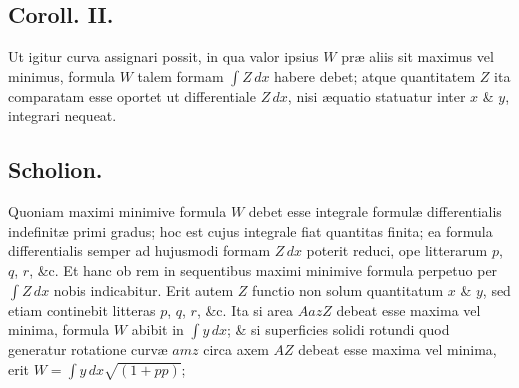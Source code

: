 \subsection*{Coroll. II.}
Ut igitur curva assignari possit, in qua valor ipsius $W$ præ aliis sit maximus vel minimus, formula $W$ talem formam $\int Z\,dx$ habere debet; atque quantitatem $Z$ ita comparatam esse oportet ut differentiale $Z\,dx$, nisi æquatio statuatur inter $x$ \& $y$, integrari nequeat.

\subsection*{Scholion.}
Quoniam maximi minimive formula $W$ debet esse integrale formulæ differentialis indefinitæ primi gradus; hoc est cujus integrale fiat quantitas finita; ea formula differentialis semper ad hujusmodi formam $Z\,dx$ poterit reduci, ope litterarum $p$, $q$, $r$, \&c. Et hanc ob rem in sequentibus maximi minimive formula perpetuo per $\int Z\,dx$ nobis indicabitur. Erit autem $Z$ functio non solum quantitatum $x$ \& $y$, sed etiam continebit litteras $p$, $q$, $r$, \&c. Ita si area $AazZ$ debeat esse maxima vel minima, formula $W$ abibit in $\int y\,dx$; \& si superficies solidi rotundi quod generatur rotatione curvæ $amz$ circa axem $AZ$ debeat esse maxima vel minima, erit $W=\int y\,dx\sqrt{(1+pp)}$;
